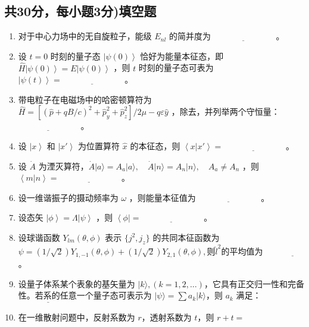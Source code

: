 \subsection{共30分，每小题3分)填空题}
\begin{enumerate}
    \item 对于中心力场中的无自旋粒子，能级 $E_{nl}$ 的简并度为 $\underline{\hspace{3cm}}$ 。
    \item 设 $t=0$ 时刻的量子态 $\left|\psi(0)\right\rangle$ 恰好为能量本征态，即 $\hat{H}\left|\psi(0)\right\rangle = E\left|\psi(0)\right\rangle$ ，则 $t$ 时刻的量子态可表为 $\left|\psi(t)\right\rangle = \underline{\hspace{3cm}}$ 。
    \item 带电粒子在电磁场中的哈密顿算符为 $\hat{H} = \left[(\hat{p} + qB/c)^2 + \hat{p}_y^2 + \hat{p}_z^2\right]/ 2\mu - q \varepsilon \hat{y}$ ，除去，并列举两个守恒量： $\underline{\hspace{3cm}}$ 。
    \item 设 $\left| x \right\rangle$ 和 $\left| x' \right\rangle$ 为位置算符 $\hat{x}$ 的本征态，则 $\left\langle x \left| x' \right\rangle\right. = \underline{\hspace{3cm}}$ 。
    \item 设 $\dot{A}$ 为湮灭算符，$\dot{A} |a\rangle = A_a |a\rangle , \quad \dot{A} |n\rangle = A_n |n\rangle , \quad A_a \neq A_n$ ，则 $\left\langle m \left| n \right\rangle\right. = \underline{\hspace{3cm}}$ 。
    \item 设一维谐振子的摄动频率为 $\omega$ ，则能量本征值为 $\underline{\hspace{3cm}}$ 。
    \item 设态矢 $\left|\phi\right\rangle =  \Lambda\left|\psi\right\rangle$ ，则 $\left\langle \phi|\right. = \underline{\hspace{3cm}}$ 。
    \item 设球谐函数 $Y_{lm}(\theta, \phi)$ 表示 $\{j^2, j_z\}$ 的共同本征函数为$\psi = (1/\sqrt{2}) Y_{1,-1}(\theta, \phi) + (1/\sqrt{2})Y_{2,1}(\theta, \phi), \text{则} \hat{l}^2 \text{的平均值为}\underline{\hspace{3cm}}$ 。
    \item 设量子体系某个表象的基矢量为 $|k\rangle, (k = 1, 2, \ldots)$，它具有正交归一性和完备性。若系的任意一个量子态可表示为 $|\psi\rangle = \sum a_k|k\rangle$，则 $a_k$ 满足：$\underline{\hspace{3cm}}$
    \item 在一维散射问题中，反射系数为 $r$，透射系数为 $t$，则 $r + t = $
\end{enumerate}
